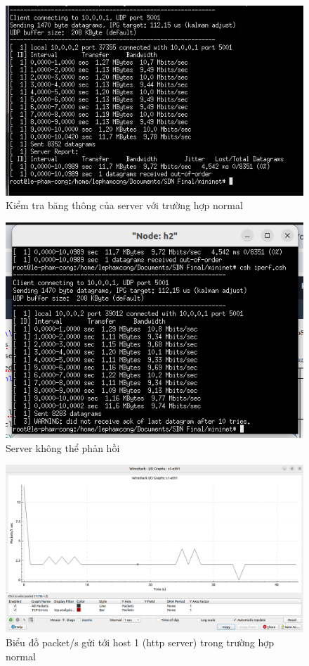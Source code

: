 \documentclass[a4paper]{article}
\begin{document}
\begin{figure}
    \centering
    \includegraphics[width=0.75\linewidth]{images//result/bw_normal.png}
    \caption{Kiểm tra băng thông của server với trường hợp normal}
    \label{fig:bw_normal}
\end{figure}
\begin{figure}
    \centering
    \includegraphics[width=0.75\linewidth]{images//result/bw_ddos.png}
    \caption{Server không thể phản hồi}
    \label{fig:bw_ddos}
\end{figure}
\begin{figure}
    \centering
    \includegraphics[width=1\linewidth]{images//result/wireshark_normal.png}
    \caption{Biểu đồ packet/s gửi tới host 1 (http server) trong trường hợp normal}
    \label{fig:wireshark_normal}
\end{figure}
\end{document}
